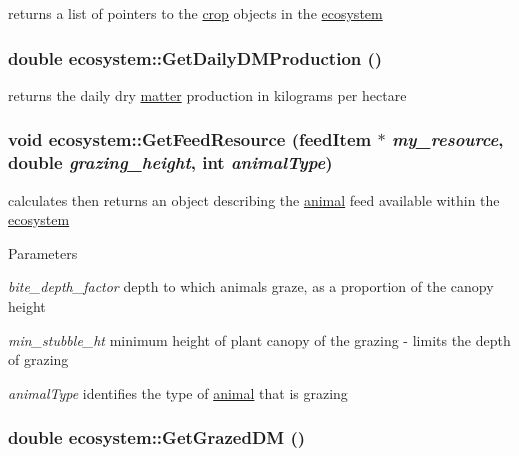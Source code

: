 returns a list of pointers to the \hyperlink{classcrop}{crop} objects in the \hyperlink{classecosystem}{ecosystem} \hypertarget{classecosystem_abbe9518375cd9faa312a57df3e5e3a05}{
\subsubsection[{GetDailyDMProduction}]{\setlength{\rightskip}{0pt plus 5cm}double ecosystem::GetDailyDMProduction ()}}
\label{classecosystem_abbe9518375cd9faa312a57df3e5e3a05}


returns the daily dry \hyperlink{classmatter}{matter} production in kilograms per hectare \hypertarget{classecosystem_a93d176ab8d86edc9eca29a1d831648c4}{
\subsubsection[{GetFeedResource}]{\setlength{\rightskip}{0pt plus 5cm}void ecosystem::GetFeedResource ({\bf feedItem} $\ast$ {\em my\_\-resource}, \/  double {\em grazing\_\-height}, \/  int {\em animalType})}}
\label{classecosystem_a93d176ab8d86edc9eca29a1d831648c4}


calculates then returns an object describing the \hyperlink{classanimal}{animal} feed available within the \hyperlink{classecosystem}{ecosystem} 
\begin{DoxyParams}{Parameters}
\item[{\em bite\_\-depth\_\-factor}]depth to which animals graze, as a proportion of the canopy height \item[{\em min\_\-stubble\_\-ht}]minimum height of plant canopy of the grazing -\/ limits the depth of grazing \item[{\em animalType}]identifies the type of \hyperlink{classanimal}{animal} that is grazing \end{DoxyParams}
\hypertarget{classecosystem_af149c5955062135fb6cff4174e6b82ba}{
\subsubsection[{GetGrazedDM}]{\setlength{\rightskip}{0pt plus 5cm}double ecosystem::GetGrazedDM ()}}
\label{classecosystem_af149c5955062135fb6cff4174e6b82ba}


